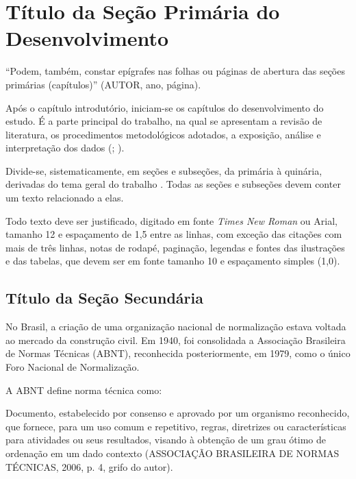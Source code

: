 \chapter{Título da Seção Primária do Desenvolvimento}

\begin{SingleSpace}
\begin{flushright}
\begin{minipage}[b]{8cm}
\begin{small}
``Podem, também, constar epígrafes nas folhas ou páginas de abertura das seções primárias (capítulos)'' (AUTOR, ano, página).
\end{small}
\end{minipage}
\end{flushright}
\end{SingleSpace}

Após o capítulo introdutório, iniciam-se os capítulos do desenvolvimento do estudo. É a parte principal do trabalho, na qual se apresentam a revisão de literatura, os procedimentos metodológicos adotados, a exposição, análise e interpretação dos dados (\cite{koche}; \cite{marconi}).

Divide-se, sistematicamente, em seções e subseções, da primária à quinária, derivadas do tema geral do trabalho \cite{barros}. Todas as seções e subseções devem conter um texto relacionado a elas.

Todo texto deve ser justificado, digitado em fonte \textit{Times New Roman} ou Arial, tamanho 12 e espaçamento de 1,5 entre as linhas, com exceção das citações com mais de três linhas, notas de rodapé, paginação, legendas e fontes das ilustrações e das tabelas, que devem ser em fonte tamanho 10 e espaçamento simples (1,0).

\section{Título da Seção Secundária}

No Brasil, a criação de uma organização nacional de normalização estava voltada ao mercado da construção civil. Em 1940, foi consolidada a Associação Brasileira de Normas Técnicas (ABNT), reconhecida posteriormente, em 1979, como o único Foro Nacional de Normalização.

A ABNT define norma técnica como:

\begin{SingleSpace}
\begin{flushright}
\begin{minipage}[b]{12cm}
\begin{small}
Documento, estabelecido por consenso e aprovado por um organismo reconhecido, que fornece, para um uso comum e repetitivo, regras, diretrizes ou características para atividades ou seus resultados, visando à obtenção de um grau ótimo de ordenação em um dado contexto (ASSOCIAÇÃO BRASILEIRA DE NORMAS TÉCNICAS, 2006, p. 4, grifo do autor).
\end{small}
\end{minipage}
\end{flushright}
\end{SingleSpace}

